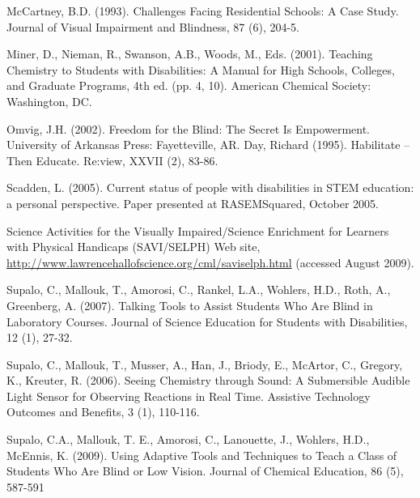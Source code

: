 \documentclass[11.5pt]{sig-alternate} %
\begin{document}
McCartney, B.D. (1993). Challenges Facing Residential Schools: A Case Study. Journal of Visual Impairment and Blindness, 87 (6), 204-5.

Miner, D., Nieman, R., Swanson, A.B., Woods, M., Eds. (2001). Teaching Chemistry to Students with Disabilities: A Manual for High Schools, Colleges, and Graduate Programs, 4th ed. (pp. 4, 10). American Chemical Society: Washington, DC.

Omvig, J.H. (2002). Freedom for the Blind: The Secret Is Empowerment. University of Arkansas Press: Fayetteville, AR. Day, Richard (1995). Habilitate – Then Educate. Re:view, XXVII (2), 83-86.

Scadden, L. (2005). Current status of people with disabilities in STEM education: a personal perspective. Paper presented at RASEMSquared, October 2005.

Science Activities for the Visually Impaired/Science Enrichment for Learners with Physical Handicaps (SAVI/SELPH) Web site, \url{http://www.lawrencehallofscience.org/cml/saviselph.html} (accessed August 2009).

Supalo, C., Mallouk, T., Amorosi, C., Rankel, L.A., Wohlers, H.D., Roth, A., Greenberg, A. (2007). Talking Tools to Assist Students Who Are Blind in Laboratory Courses. Journal of Science Education for Students with Disabilities, 12 (1), 27-32.

Supalo, C., Mallouk, T., Musser, A., Han, J., Briody, E., McArtor, C., Gregory, K., Kreuter, R. (2006). Seeing Chemistry through Sound: A Submersible Audible Light Sensor for Observing Reactions in Real Time. Assistive Technology Outcomes and Benefits, 3 (1), 110-116.

Supalo, C.A., Mallouk, T. E., Amorosi, C., Lanouette, J., Wohlers, H.D., McEnnis, K. (2009). Using Adaptive Tools and Techniques to Teach a Class of Students Who Are Blind or Low Vision. Journal of Chemical Education, 86 (5), 587-591
\end{document}
